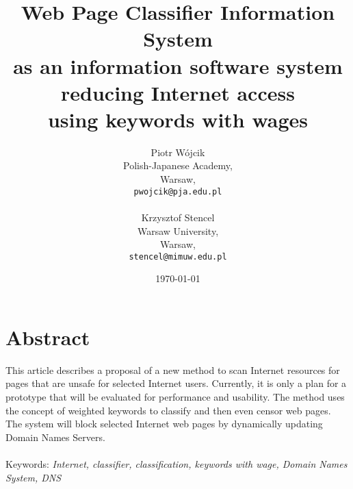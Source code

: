 \documentclass[9pt,a4paper]{extarticle}
\title{Web Page Classifier Information System\\ as an information software system\\ reducing Internet access\\ using keywords with wages}
\author{Piotr W\'{o}jcik\\
    Polish-Japanese Academy,\\
    Warsaw,\\
    \texttt{pwojcik@pja.edu.pl}\\
\\
    Krzysztof Stencel\\
    Warsaw University,\\
    Warsaw,\\
    \texttt{stencel@mimuw.edu.pl}}
\date{\today}
\begin{document}
\maketitle



\section{Abstract}
This article describes a proposal of a new method to scan Internet resources for pages that are unsafe for selected Internet users. 
Currently, it is only a plan for a prototype that will be evaluated for performance and usability. 
The method uses the concept of weighted keywords to classify and then even censor web pages.
The system will block selected Internet web pages by dynamically updating Domain Names Servers.\\
\\
Keywords: \textit{Internet, classifier, classification, keywords with wage, Domain Names System, DNS}
\end{document}

